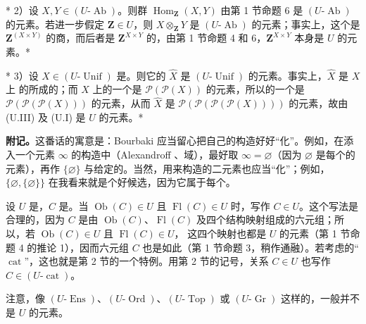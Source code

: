 * 2）设 $X,Y\in(U\text{-}\operatorname{Ab})$。则群 $\operatorname{Hom}_{\mathbf Z}(X,Y)$ 由第 1 节命题 6 是 $(U\text{-}\operatorname{Ab})$ 的元素。若进一步假定 $\mathbf Z\in U$，则 $X\otimes_{\mathbf Z}Y$ 是 $(U\text{-}\operatorname{Ab})$ 的元素；事实上，这个是 $\mathbf Z^{(X\times Y)}$ 的商，而后者是 $\mathbf Z^{X\times Y}$ 的，由第 1 节命题 4 和 6，$\mathbf Z^{X\times Y}$ 本身是 $U$ 的元素。*

* 3）设 $X\in(U\text{-}\operatorname{Unif})$ 是。则它的 $\widehat X$ 是 $(U\text{-}\operatorname{Unif})$ 的元素。事实上，$\widehat X$ 是 $X$ 上 的所成的；而 $X$ 上的一个是 $\mathcal P(\mathcal P(X))$ 的元素，所以的一个是 $\mathcal P(\mathcal P(\mathcal P(X)))$ 的元素，从而 $\widehat X$ 是 $\mathcal P(\mathcal P(\mathcal P(\mathcal P(X))))$ 的元素，故由 (U.III) 及 (U.I) 是 $U$ 的元素。*

\textbf{附记。}这番话的寓意是：Bourbaki 应当留心把自己的构造好好“化”。例如，在添入一个元素 $\infty$ 的构造中（Alexandroff 、域），最好取 $\infty=\varnothing$（因为 $\varnothing$ 是每个的元素），再作 $\{\varnothing\}$ 与给定的。当然，用来构造的二元素也应当“化”；例如，$\{\varnothing,\{\varnothing\}\}$ 在我看来就是个好候选，因为它属于每个。

设 $U$ 是，$C$ 是。当 $\operatorname{Ob}(C)\in U$ 且 $\operatorname{Fl}(C)\in U$ 时，写作 $C\in U$。这个写法是合理的，因为 $C$ 是由 $\operatorname{Ob}(C)$、$\operatorname{Fl}(C)$ 及四个结构映射组成的六元组；所以，若 $\operatorname{Ob}(C)\in U$ 且 $\operatorname{Fl}(C)\in U$，
这四个映射也都是 $U$ 的元素（第 1 节命题 4 的推论 1），因而六元组 $C$ 也是如此（第 1 节命题 3，稍作通融）。若考虑的“$\operatorname{cat}$”，这也就是第 2 节的一个特例。用第 2 节的记号，关系 $C\in U$ 也写作 $C\in(U\text{-}\operatorname{cat})$。

注意，像 $(U\text{-}\operatorname{Ens})$、$(U\text{-}\operatorname{Ord})$、$(U\text{-}\operatorname{Top})$ 或 $(U\text{-}\operatorname{Gr})$ 这样的，一般并不是 $U$ 的元素。

